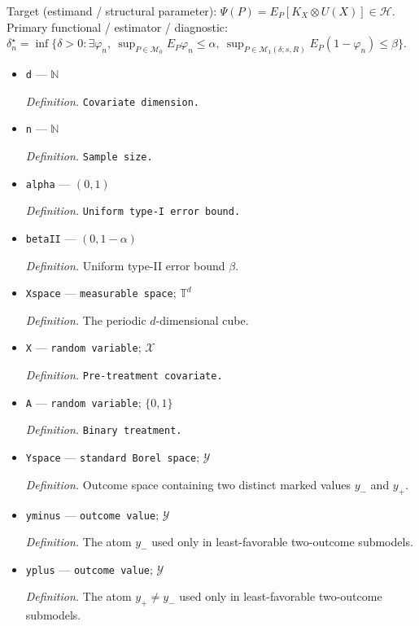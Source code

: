 \documentclass{article}
\begin{document}
Target (estimand / structural parameter): \(\Psi(P)=E_P[K_X\otimes U(X)]\in\mathcal H\).
Primary functional / estimator / diagnostic: \(\delta_n^\star=\inf\{\delta>0:\exists\varphi_n,\ \sup_{P\in\mathcal M_0}E_P\varphi_n\le\alpha,\ \sup_{P\in\mathcal M_1(\delta;s,R)}E_P(1-\varphi_n)\le\beta\}\).
\begin{itemize}
  \item \texttt{d} --- \(\mathbb{N}\)
  \par\smallskip\noindent\emph{Definition.} \texttt{Covariate dimension.}
  \item \texttt{n} --- \(\mathbb{N}\)
  \par\smallskip\noindent\emph{Definition.} \texttt{Sample size.}
  \item \texttt{alpha} --- \((0,1)\)
  \par\smallskip\noindent\emph{Definition.} \texttt{Uniform type-\allowbreak{}I error bound.}
  \item \texttt{betaII} --- \((0,1-\alpha)\)
  \par\smallskip\noindent\emph{Definition.} Uniform type-II error bound \(\beta\).
  \item \texttt{Xspace} --- \texttt{measurable space}; \(\mathbb{T}^{d}\)
  \par\smallskip\noindent\emph{Definition.} The periodic \(d\)-dimensional cube.
  \item \texttt{X} --- \texttt{random variable}; \(\mathcal X\)
  \par\smallskip\noindent\emph{Definition.} \texttt{Pre-\allowbreak{}treatment covariate.}
  \item \texttt{A} --- \texttt{random variable}; \(\{0,1\}\)
  \par\smallskip\noindent\emph{Definition.} \texttt{Binary treatment.}
  \item \texttt{Yspace} --- \texttt{standard Borel space}; \(\mathcal Y\)
  \par\smallskip\noindent\emph{Definition.} Outcome space containing two distinct marked values \(y_-\) and \(y_+\).
  \item \texttt{yminus} --- \texttt{outcome value}; \(\mathcal Y\)
  \par\smallskip\noindent\emph{Definition.} The atom \(y_-\) used only in least-favorable two-outcome submodels.
  \item \texttt{yplus} --- \texttt{outcome value}; \(\mathcal Y\)
  \par\smallskip\noindent\emph{Definition.} The atom \(y_+\neq y_-\) used only in least-favorable two-outcome submodels.

\end{itemize}
\end{document}
